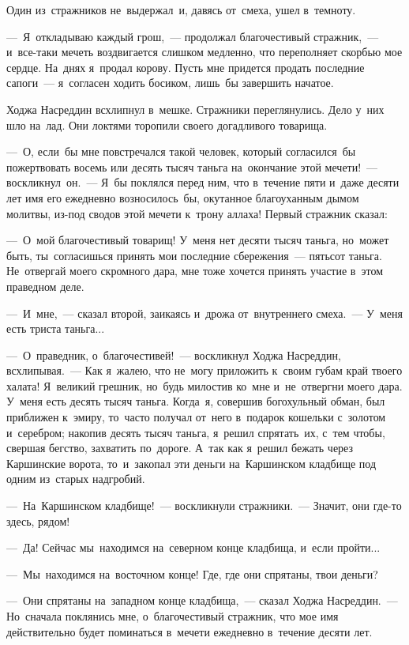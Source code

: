 \documentclass[12pt,a4paper]{book}
\begin{document}
Один из~стражников не~выдержал~и, давясь от~смеха, ушел в~темноту.

—~Я~откладываю каждый грош,~— продолжал благочестивый стражник,~— и~все-таки мечеть воздвигается слишком медленно, что переполняет скорбью мое сердце. На~днях я~продал корову. Пусть мне придется продать последние сапоги~— я~согласен ходить босиком, лишь~бы завершить начатое.

Ходжа Насреддин всхлипнул в~мешке. Стражники переглянулись. Дело у~них шло на~лад. Они локтями торопили своего догадливого товарища.

—~О, если~бы мне повстречался такой человек, который согласился~бы пожертвовать восемь или десять тысяч таньга на~окончание этой мечети!~— воскликнул~он.~— Я~бы поклялся перед ним, что в~течение пяти и~даже десяти лет имя его ежедневно возносилось~бы, окутанное благоуханным дымом молитвы, из-под сводов этой мечети к~трону аллаха! Первый стражник сказал:

—~О~мой благочестивый товарищ! У~меня нет десяти тысяч таньга, но~может быть, ты~согласишься принять мои последние сбережения~— пятьсот таньга. Не~отвергай моего скромного дара, мне тоже хочется принять участие в~этом праведном деле.

—~И~мне,~— сказал второй, заикаясь и~дрожа от~внутреннего смеха.~— У~меня есть триста таньга...

—~О~праведник, о~благочестивей!~— воскликнул Ходжа Насреддин, всхлипывая.~— Как я~жалею, что не~могу приложить к~своим губам край твоего халата! Я~великий грешник, но~будь милостив ко~мне и~не~отвергни моего дара. У~меня есть десять тысяч таньга. Когда~я, совершив богохульный обман, был приближен к~эмиру, то~часто получал от~него в~подарок кошельки с~золотом и~серебром; накопив десять тысяч таньга, я~решил спрятать~их, с~тем чтобы, свершая бегство, захватить по~дороге. А~так как я~решил бежать через Каршинские ворота, то~и~закопал эти деньги на~Каршинском кладбище под одним из~старых надгробий.

—~На~Каршинском кладбище!~— воскликнули стражники.~— Значит, они где-то здесь, рядом!

—~Да! Сейчас мы~находимся на~северном конце кладбища, и~если пройти...

—~Мы~находимся на~восточном конце! Где, где они спрятаны, твои деньги?

—~Они спрятаны на~западном конце кладбища,~— сказал Ходжа Насреддин.~— Но~сначала поклянись мне, о~благочестивый стражник, что мое имя действительно будет поминаться в~мечети ежедневно в~течение десяти лет.
\end{document}
